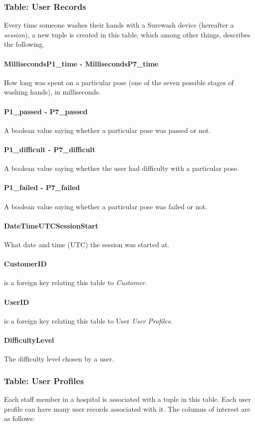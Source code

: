         \subsubsection{Table: User Records} Every time someone washes their hands with a Surewash device (hereafter a {\slshape session}), a new tuple is created in this table, which among other things, describes the following.
            \paragraph{MillisecondsP1\_time - MillisecondsP7\_time} How long was spent on a particular pose (one of the seven possible stages of washing hands), in milliseconds.
            \paragraph{P1\_passed - P7\_passed} A boolean value saying whether a particular pose was passed or not.
            \paragraph{P1\_difficult - P7\_difficult} A boolean value saying whether the user had difficulty with a particular pose.
            \paragraph{P1\_failed - P7\_failed} A boolean value saying whether a particular pose was failed or not.
            \paragraph{DateTimeUTCSessionStart} What date and time (UTC) the session was started at.
            \paragraph{CustomerID} is a foreign key relating this table to {\slshape Customer}.
            \paragraph{UserID} is a foreign key relating this table to User {\slshape User Profiles}.
            \paragraph{DifficultyLevel} The difficulty level chosen by a user.
        \subsubsection{Table: User Profiles} Each staff member in a hospital is associated with a tuple in this table. Each user profile can have many user records associated with it. The columns of interest are as follows:
